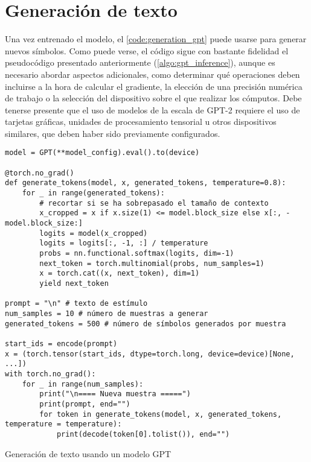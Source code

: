 \section{Generación de texto}
Una vez entrenado el modelo, el \cref{code:generation_gpt} puede usarse para generar nuevos símbolos. Como puede verse, el código sigue con bastante fidelidad el pseudocódigo presentado anteriormente (\cref{algo:gpt_inference}), aunque es necesario abordar aspectos adicionales, como determinar qué operaciones deben incluirse a la hora de calcular el gradiente, la elección de una precisión numérica de trabajo o la selección del dispositivo sobre el que realizar los cómputos. Debe tenerse presente que el uso de modelos de la escala de GPT-2 requiere el uso de tarjetas gráficas, unidades de procesamiento tensorial u otros dispositivos similares, que deben haber sido previamente configurados.

\begin{code}
\begin{verbatim}
model = GPT(**model_config).eval().to(device)

@torch.no_grad()
def generate_tokens(model, x, generated_tokens, temperature=0.8):
    for _ in range(generated_tokens):
        # recortar si se ha sobrepasado el tamaño de contexto
        x_cropped = x if x.size(1) <= model.block_size else x[:, -model.block_size:]
        logits = model(x_cropped)
        logits = logits[:, -1, :] / temperature
        probs = nn.functional.softmax(logits, dim=-1)
        next_token = torch.multinomial(probs, num_samples=1)
        x = torch.cat((x, next_token), dim=1)
        yield next_token

prompt = "\n" # texto de estímulo
num_samples = 10 # número de muestras a generar
generated_tokens = 500 # número de símbolos generados por muestra

start_ids = encode(prompt)
x = (torch.tensor(start_ids, dtype=torch.long, device=device)[None, ...])
with torch.no_grad():
    for _ in range(num_samples):
        print("\n==== Nueva muestra =====")
        print(prompt, end="")
        for token in generate_tokens(model, x, generated_tokens, temperature = temperature):
            print(decode(token[0].tolist()), end="")
\end{verbatim}
\caption{Generación de texto usando un modelo GPT}
\label{code:generation_gpt}
\end{code}

